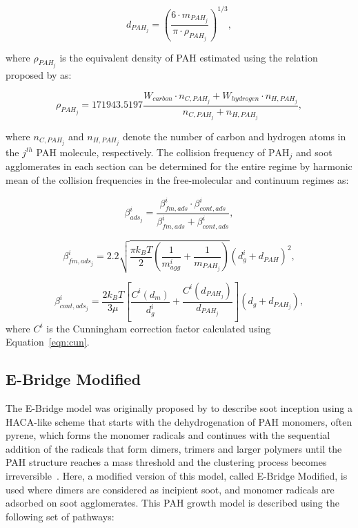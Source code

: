 \begin{equation}
	d_{PAH_j}=
	\left(
		\frac{6\cdot m_{{PAH}_j}}{\pi\cdot\rho_{{PAH}_j}}
	\right)^{1/3},
	\label{eqn:dPAH}
\end{equation}

\noindent where $\rho_{PAH_j}$ is the equivalent density of PAH estimated using the relation proposed by \citet{johansson2016formation} as:

\begin{equation}
	\rho_{PAH_j}= 
	171943.5197
	\frac{W_{carbon}\cdot n_{C,{PAH}_j}+W_{hydrogen}\cdot n_{H,{PAH}_j}}
	{n_{C,{PAH}_j}+n_{H,{PAH}_j}},
	\label{eqn:rhoPAH}
\end{equation}

\noindent where ${n_{C,{PAH}_j}}$ and ${n_{H,{PAH}_j}}$ denote the number of carbon and hydrogen atoms in the $j^{th}$ PAH molecule, respectively. The collision frequency of $\mathrm{PAH}_j$ and soot agglomerates in each section can be determined for the entire regime by harmonic mean of the collision frequencies in the free-molecular and continuum regimes as:

\begin{equation}
	\beta^i_{ads_j}=
	\frac{\beta^i_{fm, ads}\cdot \beta^i_{cont, ads}}
	{\beta^i_{fm, ads}+\beta^i_{cont, ads}},
	\label{eqn:betahmads}
\end{equation}

\begin{equation}
	\beta^i_{fm, ads_j}=
	2.2 
	\sqrt{
		\frac{\pi k_B T}{2}\left(\frac{1}{m^i_{agg}}+\frac{1}{m_{PAH_j}}\right)
	}
	\left(d^i_g+d_{PAH}\right)^2,
	\label{eqn:betafmads}
\end{equation}

\begin{equation}
	\beta^i_{cont, ads_j}=
		\frac{2 k_B T}{3 \mu}
		\left[
			\frac{C^i\left(d_m\right)}{d^i_g}+
			\frac{C^i\left(d_{PAH_j}\right)}{d_{PAH_j}}
		\right]
		\left(d_g+d_{PAH_j}\right),
	\label{eqn:betacontads}
\end{equation}
where $C^i$ is the Cunningham correction factor calculated using Equation~\eqref{eqn:cun}.

\subsection{E-Bridge Modified}
\label{sec:ebrimod}
The E-Bridge model was originally proposed by \citet{frenklach2020mechanism} to describe soot inception using a HACA-like scheme that starts with the dehydrogenation of PAH monomers, often pyrene, which forms the monomer radicals and continues with the sequential addition of the radicals that form dimers, trimers and larger polymers until the PAH structure reaches a mass threshold and the clustering process becomes irreversible~\citep{frenklach2020mechanism}. Here, a modified version of this model, called E-Bridge Modified, is used where dimers are considered as incipient soot, and monomer radicals are adsorbed on soot agglomerates. This PAH growth model is described using the following set of pathways:


